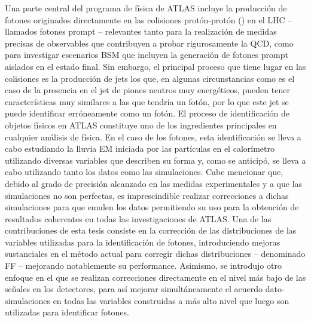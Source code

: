 Una parte central del programa de física de \ac{ATLAS} incluye la producción de fotones originados directamente en las colisiones protón-protón (\pp) en el \ac{LHC} -- llamados fotones prompt -- relevantes tanto para la realización de medidas precisas de observables que contribuyen a probar rigurosamente la \ac{QCD}, como para investigar escenarios \ac{BSM} que incluyen la generación de fotones prompt aislados en el estado final. Sin embargo, el principal proceso que tiene lugar en las colisiones \pp es la producción de jets los que, en algunas circunstancias como es el caso de la presencia en el jet de piones neutros muy energéticos, pueden tener características muy similares a las que tendría un fotón, por lo que este jet se puede identificar erróneamente como un fotón. El proceso de identificación de objetos físicos en \ac{ATLAS} constituye uno de los ingredientes principales en cualquier análisis de física. En el caso de los fotones, esta identificación se lleva a cabo estudiando la lluvia \ac{EM} iniciada por las partículas en el calorímetro utilizando diversas variables que describen su forma y, como se anticipó, se lleva a cabo utilizando tanto los datos como las simulaciones. Cabe mencionar que, debido al grado de precisión alcanzado en las medidas experimentales y a que las simulaciones no son perfectas, es imprescindible realizar correcciones a dichas simulaciones para que emulen los datos permitiendo su uso para la obtención de resultados coherentes en todas las investigaciones de \ac{ATLAS}. Una de las contribuciones de esta tesis consiste en la corrección de las distribuciones de las variables utilizadas para la identificación de fotones, introduciendo mejoras sustanciales en el método actual para corregir dichas distribuciones -- denominado \ac{FF} -- mejorando notablemente su performance. Asimismo, se introdujo otro enfoque en el que se realizan correcciones directamente en el nivel más bajo de las señales en los detectores, para así mejorar  simultáneamente el acuerdo dato-simulaciones en todas las variables construidas a más alto nivel que luego son utilizadas para identificar fotones.

